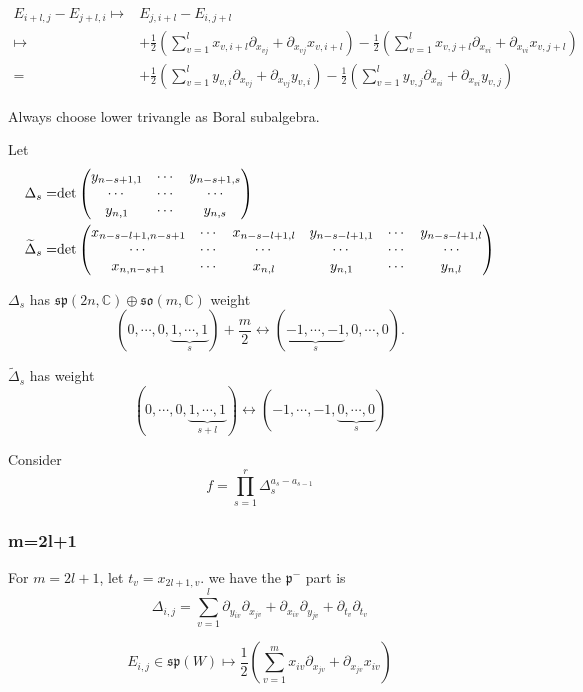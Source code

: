 \documentclass[12pt]{amsart}
\def\bC{{\mathbb{C}}}
\def\det{{\rm det}}
\def\tDelta{\widetilde{\Delta}}
\def\aso{\mathfrak{so}}
\def\asp{\mathfrak{sp}}
\def\fpp{\mathfrak{p}}
\begin{document}
\[
\begin{split}
E_{i+l,j}-E_{j+l,i}\mapsto &E_{j,i+l}- E_{i,j+l} \\
\mapsto &
+\frac{1}{2}(\sum_{v=1}^l x_{v,i+l}\partial_{x_{vj}}+\partial_{x_{vj}}x_{v,i+l})
-\frac{1}{2}(\sum_{v=1}^l x_{v,j+l}\partial_{x_{vi}}+\partial_{x_{vi}}x_{v,j+l})\\
=&
+\frac{1}{2}(\sum_{v=1}^l y_{v,i}\partial_{x_{vj}}+\partial_{x_{vj}}y_{v,i})
-\frac{1}{2}(\sum_{v=1}^l y_{v,j}\partial_{x_{vi}}+\partial_{x_{vi}}y_{v,j})
\end{split}
\]

Always choose lower trivangle as Boral subalgebra. 

Let 
\begin{align*}
\Delta_s =& \det\begin{pmatrix}
y_{n-s+1,1} & \cdots & y_{n-s+1, s} \\
\cdots & \cdots & \cdots \\
y_{n,1} & \cdots & y_{n,s}
\end{pmatrix}\\
\tDelta_s = & \det\begin{pmatrix}
x_{n-s-l+1, n-s+1} & \cdots & x_{n-s-l+1,l} & y_{n-s-l+1,1} & \cdots & y_{n-s-l+1,l}\\
\cdots&\cdots&\cdots&\cdots&\cdots&\cdots \\
x_{n, n-s+1} & \cdots & x_{n,l} & y_{n,1} & \cdots & y_{n,l}
\end{pmatrix}
\end{align*}

$\Delta_s$ has $\asp(2n,\bC)\oplus \aso(m,\bC)$ weight 
\[
(0, \cdots, 0, \underbrace{1, \cdots, 1}_s)+\frac{m}{2}
\leftrightarrow
(\underbrace{-1,\cdots, -1}_s, 0,\cdots, 0) .
\]

$\tDelta_s$ has weight
\[
(0, \cdots, 0, \underbrace{1,\cdots, 1}_{s+l})
\leftrightarrow (-1,\cdots, -1, \underbrace{0,\cdots, 0}_s)
\]


Consider 
\[
f=\prod_{s=1}^r\Delta_s^{a_s-a_{s-1}} 
\]


\subsubsection{m=2l+1}

For $m=2l+1$, let $t_v = x_{2l+1,v}$.  
we have 
the $\fpp^-$ part is 
\[
\Delta_{i,j} = 
\sum_{v=1}^l \partial_{y_{iv}}\partial_{x_{jv}}
+ \partial_{x_{iv}}\partial_{y_{jv}} + \partial_{t_v}\partial_{t_v}
\]


\[
E_{i,j} \in \asp(W)  
 \mapsto \frac{1}{2}(\sum_{v=1}^m x_{iv}\partial_{x_{jv}}+ \partial_{x_{jv}}x_{iv}) 
\]
\end{document}
